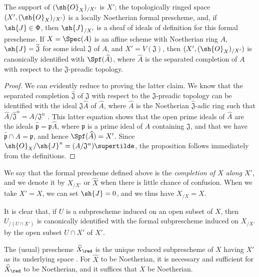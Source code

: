 \begin{proposition}[10.8.5]
\label{I.10.8.5}
The support of $(\sh{O}_X)_{/X'}$ is $X'$; the topologically ringed space $(X',(\sh{O}_X)_{/X'})$ is a locally Noetherian formal prescheme, and, if $\sh{J}\in\Phi$, then $\sh{J}_{/X'}$ is a sheaf of ideals of definition for this formal prescheme.
If $X=\Spec(A)$ is an affine scheme with Noetherian ring $A$, $\sh{J}=\widetilde{\mathfrak{J}}$ for some ideal $\mathfrak{J}$ of $A$, and $X'=V(\mathfrak{J})$, then $(X',(\sh{O}_X)_{/X'})$ is canonically identified with $\Spf(\widehat{A})$, where $\widehat{A}$ is the separated completion of $A$ with respect to the $\mathfrak{J}$-preadic topology.
\end{proposition}

\begin{proof}
We can evidently reduce to proving the latter claim.
We know  that the separated completion $\widehat{\mathfrak{J}}$ of $\mathfrak{J}$ with respect to the $\mathfrak{J}$-preadic topology can be identified with the ideal $\mathfrak{J}\widehat{A}$ of $\widehat{A}$, where $\widehat{A}$ is the Noetherian $\widehat{\mathfrak{J}}$-adic ring such that $\widehat{A}/\widehat{\mathfrak{J}}^n=A/\mathfrak{J}^n$ .
This latter equation shows that the open prime ideals of $\widehat{A}$ are the ideals $\widehat{\mathfrak{p}}=\mathfrak{p}\widehat{A}$, where $\mathfrak{p}$ is a prime ideal of $A$ containing $\mathfrak{J}$, and that we have $\widehat{\mathfrak{p}}\cap A=\mathfrak{p}$, and hence $\Spf(\widehat{A})=X'$.
Since $\sh{O}_X/\sh{J}^n=(A/\mathfrak{J}^n)\supertilde$, the proposition follows immediately from the definitions.
\end{proof}

We say that the formal prescheme defined above is the \emph{completion of $X$ along $X'$}, and we denote it by $X_{/X'}$ or $\widehat{X}$ when there is little chance of confusion.
When we take $X'=X$, we can set $\sh{J}=0$, and we thus have $X_{/X}=X$.

It is clear that, if $U$ is a subprescheme induced on an open subset of $X$, then $U_{/(U\cap X')}$ is canonically identified with the formal subprescheme induced on $X_{/X'}$ by the open subset $U\cap X'$ of $X'$.

\begin{corollary}[10.8.6]
\label{I.10.8.6}
The (usual) prescheme $\widehat{X}_\red$ is the unique reduced subprescheme of $X$ having $X'$ as its underlying space .
For $\widehat{X}$ to be Noetherian, it is necessary and sufficient for $\widehat{X}_\red$ to be Noetherian, and it suffices that $X$ be Noetherian.
\end{corollary}

